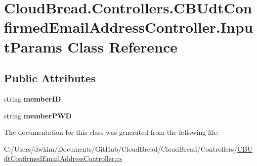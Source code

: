 \hypertarget{a00105}{}\section{Cloud\+Bread.\+Controllers.\+C\+B\+Udt\+Confirmed\+Email\+Address\+Controller.\+Input\+Params Class Reference}
\label{a00105}
\subsection*{Public Attributes}
\begin{DoxyCompactItemize}
\item 
string {\bfseries member\+ID}\hypertarget{a00105_a749b5cc55484232cc8e811b5b1728166}{}\label{a00105_a749b5cc55484232cc8e811b5b1728166}

\item 
string {\bfseries member\+P\+WD}\hypertarget{a00105_a5789ff7be8d1756df0478e1bcf5c16e9}{}\label{a00105_a5789ff7be8d1756df0478e1bcf5c16e9}

\end{DoxyCompactItemize}


The documentation for this class was generated from the following file\+:\begin{DoxyCompactItemize}
\item 
C\+:/\+Users/dwkim/\+Documents/\+Git\+Hub/\+Cloud\+Bread/\+Cloud\+Bread/\+Controllers/\hyperlink{a00227}{C\+B\+Udt\+Confirmed\+Email\+Address\+Controller.\+cs}\end{DoxyCompactItemize}
